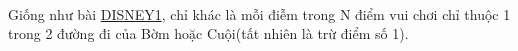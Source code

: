  

Giống như bài \href{http://vnoi.info/problems/show/DISNEY1/}{DISNEY1}, chỉ khác là mỗi điễm trong N điểm vui chơi chỉ thuộc 1 trong 2 đường đi của Bờm hoặc Cuội(tất nhiên là trừ điểm số 1).

\